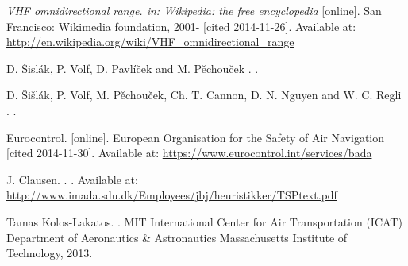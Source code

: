 \begin{thebibliography}{1}
{\em VHF omnidirectional range. in: Wikipedia: the free encyclopedia} [online].
\newblock San Francisco: Wikimedia foundation, 2001- [cited 2014-11-26].
\newblock Available at: \url{http://en.wikipedia.org/wiki/VHF_omnidirectional_range}

D. Šislák, P. Volf, D. Pavlíček and M. Pěchouček
.
.

D. Šišlák, P. Volf, M. Pěchouček, Ch. T. Cannon, D. N. Nguyen and W. C. Regli
.
.

Eurocontrol.
 [online].
\newblock European Organisation for the Safety of Air Navigation [cited 2014-11-30].
\newblock Available at: \url{https://www.eurocontrol.int/services/bada}

J. Clausen.
.
.
\newblock Available at: \url{http://www.imada.sdu.dk/Employees/jbj/heuristikker/TSPtext.pdf}

Tamas Kolos-Lakatos.
.
\newblock MIT International Center for Air Transportation (ICAT) Department of Aeronautics \& Astronautics Massachusetts Institute of Technology, 2013.






\end{thebibliography}

